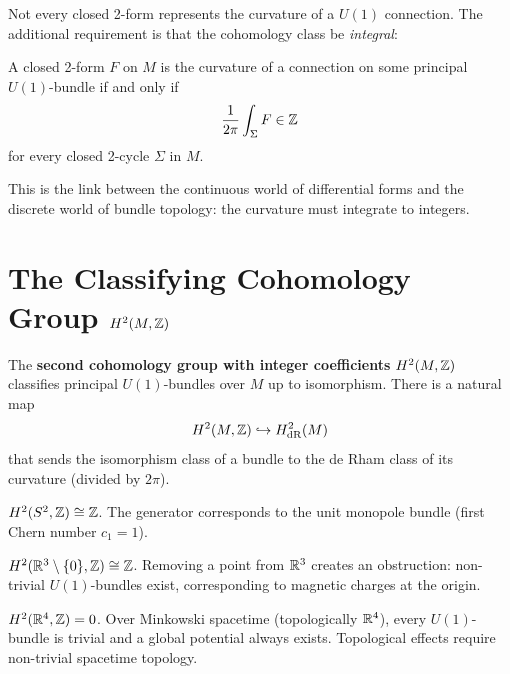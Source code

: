Not every closed 2-form represents the curvature of a $U(1)$ connection. The additional requirement is that the cohomology class be \emph{integral}:

\begin{theorem}
A closed 2-form $F$ on $M$ is the curvature of a connection on some principal $U(1)$-bundle if and only if
\begin{equation}
\frac{1}{2\pi}\int_\Sigma F \in \mathbb{Z}
\end{equation}
for every closed 2-cycle $\Sigma$ in $M$.
\end{theorem}

This is the link between the continuous world of differential forms and the discrete world of bundle topology: the curvature must integrate to integers.

\section{The Classifying Cohomology Group $H^2(M, \mathbb{Z})$}

\begin{definition}
The \textbf{second cohomology group with integer coefficients} $H^2(M, \mathbb{Z})$ classifies principal $U(1)$-bundles over $M$ up to isomorphism. There is a natural map
\begin{equation}
H^2(M, \mathbb{Z}) \hookrightarrow H^2_{\text{dR}}(M)
\end{equation}
that sends the isomorphism class of a bundle to the de Rham class of its curvature (divided by $2\pi$).
\end{definition}

\begin{example}
$H^2(S^2, \mathbb{Z}) \cong \mathbb{Z}$. The generator corresponds to the unit monopole bundle (first Chern number $c_1 = 1$).
\end{example}

\begin{example}
$H^2(\mathbb{R}^3 \setminus \{0\}, \mathbb{Z}) \cong \mathbb{Z}$. Removing a point from $\mathbb{R}^3$ creates an obstruction: non-trivial $U(1)$-bundles exist, corresponding to magnetic charges at the origin.
\end{example}

\begin{example}
$H^2(\mathbb{R}^4, \mathbb{Z}) = 0$. Over Minkowski spacetime (topologically $\mathbb{R}^4$), every $U(1)$-bundle is trivial and a global potential always exists. Topological effects require non-trivial spacetime topology.
\end{example}


